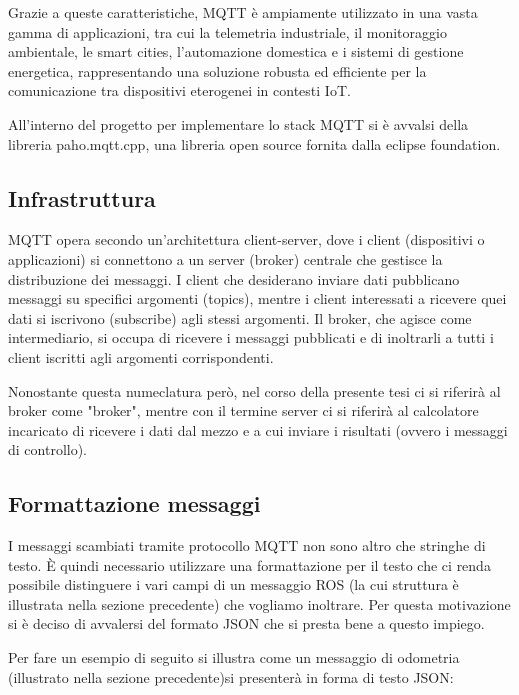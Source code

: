 \noindent Grazie a queste caratteristiche, MQTT è ampiamente utilizzato in una vasta gamma di applicazioni, tra cui la telemetria industriale, il monitoraggio ambientale, le smart cities, l'automazione domestica e i sistemi di gestione energetica, rappresentando una soluzione robusta ed efficiente per la comunicazione tra dispositivi eterogenei in contesti IoT.

\noindent All'interno del progetto per implementare lo stack MQTT si è avvalsi della libreria paho.mqtt.cpp\cite{paho_cpp}, una libreria open source fornita dalla eclipse foundation.

\subsection{Infrastruttura}
\noindent MQTT opera secondo un'architettura client-server, dove i client (dispositivi o applicazioni) si connettono a un server (broker) centrale che gestisce la distribuzione dei messaggi. I client che desiderano inviare dati pubblicano messaggi su specifici argomenti (topics), mentre i client interessati a ricevere quei dati si iscrivono (subscribe) agli stessi argomenti. Il broker, che agisce come intermediario, si occupa di ricevere i messaggi pubblicati e di inoltrarli a tutti i client iscritti agli argomenti corrispondenti.

\noindent Nonostante questa numeclatura però, nel corso della presente tesi ci si riferirà al broker come "broker", mentre con il termine server ci si riferirà al calcolatore incaricato di ricevere i dati dal mezzo e a cui inviare i risultati (ovvero i messaggi di controllo).

\subsection{Formattazione messaggi}
I messaggi scambiati tramite protocollo MQTT non sono altro che stringhe di testo. È quindi necessario utilizzare una formattazione per il testo che ci renda possibile distinguere i vari campi di un messaggio ROS (la cui struttura è illustrata nella sezione precedente) che vogliamo inoltrare. Per questa motivazione si è deciso di avvalersi del formato JSON che si presta bene a questo impiego.

\noindent Per fare un esempio di seguito si illustra come un messaggio di odometria (illustrato nella sezione precedente)si presenterà in forma di testo JSON:



